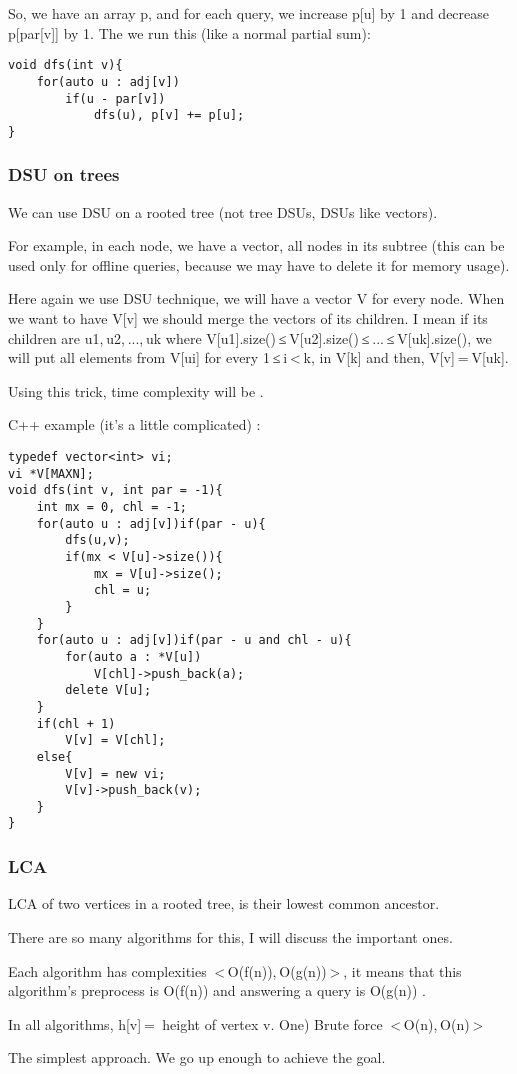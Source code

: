So, we have an array p, and for each query, we increase p[u] by 1 and decrease p[par[v]] by 1. The we run this (like a normal partial sum):
\begin{verbatim}
void dfs(int v){
	for(auto u : adj[v])
		if(u - par[v])
			dfs(u), p[v] += p[u];
}
\end{verbatim}
\subsubsection{DSU on trees}
We can use DSU on a rooted tree (not tree DSUs, DSUs like vectors).

For example, in each node, we have a vector, all nodes in its subtree (this can be used only for offline queries, because we may have to delete it for memory usage).

Here again we use DSU technique, we will have a vector V for every node. When we want to have V[v] we should merge the vectors of its children. I mean if its children are u1, u2, ..., uk where V[u1].size() ≤ V[u2].size() ≤ ... ≤ V[uk].size(), we will put all elements from V[ui] for every 1 ≤ i < k, in V[k] and then, V[v] = V[uk].

Using this trick, time complexity will be .

C++ example (it's a little complicated) :
\begin{verbatim}
typedef vector<int> vi;
vi *V[MAXN];
void dfs(int v, int par = -1){
	int mx = 0, chl = -1;
	for(auto u : adj[v])if(par - u){
		dfs(u,v);
		if(mx < V[u]->size()){
			mx = V[u]->size();
			chl = u;
		}
	}
	for(auto u : adj[v])if(par - u and chl - u){
		for(auto a : *V[u])
			V[chl]->push_back(a);
		delete V[u];
	}
	if(chl + 1)
		V[v] = V[chl];
	else{
		V[v] = new vi;
		V[v]->push_back(v);
	}
}
\end{verbatim}
\subsubsection{LCA}
LCA of two vertices in a rooted tree, is their lowest common ancestor.

There are so many algorithms for this, I will discuss the important ones.

Each algorithm has complexities  < O(f(n)), O(g(n)) > , it means that this algorithm's preprocess is O(f(n)) and answering a query is O(g(n)) .

In all algorithms, h[v] =  height of vertex v.
One) Brute force  < O(n), O(n) > 

The simplest approach. We go up enough to achieve the goal.

